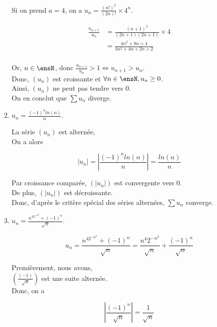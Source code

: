 \begin{enumerate}
{        Si on prend $a = 4$, on a $u_n = \frac{(n!)^2}{(2n)!} \times 4^n$.

        \begin{align*}
            \frac{u_{n + 1}}{u_n} &= \frac{(n + 1)^2}{(2n + 1)(2n + 1)} \times 4 \\
            &= \frac{4n^2 + 8n + 4}{4n^2 + 4n + 2n + 2} \\
        \end{align*}

        Or, $n \in \ensN$, donc $\frac{u_{n + 1}}{u_n} > 1 \Longleftrightarrow u_{n + 1} > u_n$. \\
        Donc, $(u_n)$ est croissante et $\forall n \in \ensN, u_n \geq 0$. \\
        Ainsi, $(u_n)$ ne peut pas tendre vers 0. \\
        On en conclut que $\sum u_n$ diverge.
    }

    \vspace{10px}
    
    \item $\displaystyle u_n = \frac{(-1)^n ln(n)}{n}$.

    \exobox
    {
        La série $(u_n)$ est alternée, \\
        On a alors
    
        $$
            | u_n | = | \frac{(-1)^nln(n)}{n} | = \frac{ln(n)}{n}
        $$

        Par croissance comparée, $(|u_n|)$ est convergente vers 0. \\
        De plus, $(|u_n|)$ est décroissante. \\
        Donc, d'après le critère spécial des séries alternées, $\sum u_n$ converge.
    }

    \clearpage
    
    \item $\displaystyle u_n = \frac{n^42^{-n^2} + (-1)^n}{\sqrt{n}}$.

    \exobox
    {
        $$
            u_n = \frac{n^42^{-n^2} + (-1)^n}{\sqrt{n}} = \frac{n^4 2^{-n^2}}{\sqrt{n}} + \frac{(-1)^n}{\sqrt{n}}
        $$

        Premièrement, nous avons, \\
        $\displaystyle (\frac{(-1)}{\sqrt{n}})$ est une suite alternée. \\
        Donc, on a
        
        $$
            | \frac{(-1)^n}{\sqrt{n}} | = \frac{1}{\sqrt{n}}
        $$

}
\end{enumerate}
